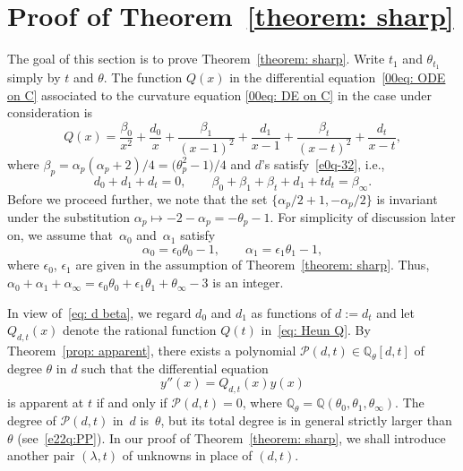 \documentclass[10pt,a4paper]{amsart}
\numberwithin{equation}{section}
\def\Q{\mathbb Q}
\begin{document}
\section{Proof of Theorem~\ref{theorem: sharp}}
\label{section: proof of Theorem 1.4}

The goal of this section is to prove Theorem~\ref{theorem: sharp}.
Write $t_1$ and $\theta_{t_1}$ simply by $t$ and $\theta$.
The function $Q(x)$ in the differential
equation~\eqref{00eq: ODE on C} associated to the curvature equation
\eqref{00eq: DE on C} in the case under consideration is
\begin{equation} \label{eq: Heun Q}
Q(x)=\frac{\beta_0}{x^2}+\frac{d_0}x
+\frac{\beta_1}{(x-1)^2}+\frac{d_1}{x-1}
+\frac{\beta_t}{(x-t)^2}+\frac{d_t}{x-t},
\end{equation}
where $\beta_p=\alpha_p(\alpha_p+2)/4=\bigl(\theta_p^2-1\bigr)/4$ and $d$'s
satisfy~\eqref{e0q-32}, i.e.,
\begin{equation} \label{eq: d beta}
d_0+d_1+d_t=0, \qquad
\beta_0+\beta_1+\beta_t+d_1+td_t=\beta_\infty.
\end{equation}
Before we proceed further, we note that the set
$\{\alpha_p/2+1,-\alpha_p/2\}$ is invariant under the substitution
$\alpha_p\mapsto-2-\alpha_p=-\theta_p-1$. For simplicity of discussion later on,
we assume that~$\alpha_0$ and~$\alpha_1$ satisfy
\begin{equation} \label{eq: choice of alpha}
\alpha_0=\epsilon_0\theta_0-1, \qquad
\alpha_1=\epsilon_1\theta_1-1,
\end{equation}
where $\epsilon_0$, $\epsilon_1$ are given in the assumption of Theorem~\ref{theorem: sharp}. Thus, $\alpha_0+\alpha_1+\alpha_\infty=\epsilon_0\theta_0
+\epsilon_1\theta_1+\theta_\infty-3$ is an integer.

In view of~\eqref{eq: d beta}, we regard $d_0$ and $d_1$ as
functions of $d:=d_t$ and let $Q_{d,t}(x)$ denote the rational function
$Q(t)$ in~\eqref{eq: Heun Q}. By Theorem~\ref{prop: apparent}, there
exists a polynomial $\mathcal P(d,t)\in\Q_{\theta}[d,t]$ of degree
$\theta$ in $d$ such that the differential equation
\begin{equation} \label{eq: Heun equation}
 y''(x)=Q_{d,t}(x)y(x)
\end{equation}
is apparent at $t$ if and only if $\mathcal P(d,t)=0$, where
$\Q_{\theta}=\Q(\theta_0,\theta_1,\theta_\infty)$. The degree of
$\mathcal P(d,t)$ in~$d$ is~$\theta$, but its total degree is in
general strictly larger than $\theta$ (see~\eqref{e22q:PP}).
In our proof of Theorem~\ref{theorem: sharp}, we shall introduce
another pair $(\lambda,t)$ of unknowns in place of $(d,t)$.
\end{document}
